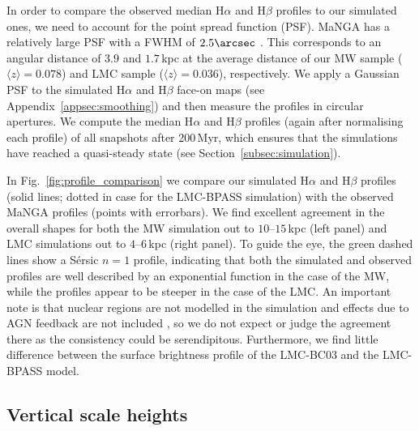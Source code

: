 \documentclass[fleqn,usenatbib]{mnras}
\begin{document}
In order to compare the observed median H$\alpha$ and H$\beta$ profiles to our simulated ones, we need to account for the point spread function (PSF). MaNGA has a relatively large PSF with a FWHM of $2.5\arcsec$ \citep{bundy15}. This corresponds to an angular distance of $3.9$ and $1.7$\,kpc at the average distance of our MW sample ($\langle z \rangle = 0.078$) and LMC sample ($\langle z \rangle = 0.036$), respectively. We apply a Gaussian PSF to the simulated H$\alpha$ and H$\beta$ face-on maps (see Appendix~\ref{appsec:smoothing}) and then measure the profiles in circular apertures. We compute the median H$\alpha$ and H$\beta$ profiles (again after normalising each profile) of all snapshots after 200\,Myr, which ensures that the simulations have reached a quasi-steady state (see Section~\ref{subsec:simulation}).

In Fig.~\ref{fig:profile_comparison} we compare our simulated H$\alpha$ and H$\beta$ profiles (solid lines; dotted in case for the LMC-BPASS simulation) with the observed MaNGA profiles (points with errorbars). We find excellent agreement in the overall shapes for both the MW simulation out to $10$--$15$\,kpc (left panel) and LMC simulations out to $4$--$6$\,kpc (right panel). To guide the eye, the green dashed lines show a S\'{e}rsic $n=1$ profile, indicating that both the simulated and observed profiles are well described by an exponential function in the case of the MW, while the profiles appear to be steeper in the case of the LMC. An important note is that nuclear regions are not modelled in the simulation and effects due to AGN feedback
are not included \citep[see, e.g.,][]{nelson21}, so we do not expect or judge the agreement there as the consistency could be serendipitous. Furthermore, we find little difference between the surface brightness profile of the LMC-BC03 and the LMC-BPASS model.


\subsection{Vertical scale heights}
\label{subsec:vertical_heights_comparison}
\end{document}
